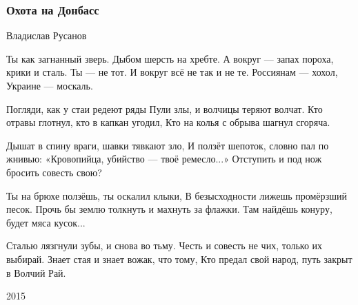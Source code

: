  
 
 

\subsubsection{Охота на Донбасс}
\label{sec:poetry.rus.dnr.vladislav_rusanov.ohota_na_donbass}

Владислав Русанов

Ты как загнанный зверь. Дыбом шерсть на хребте.
А вокруг --- запах пороха, крики и сталь.
Ты --- не тот. И вокруг всё не так и не те.
Россиянам --- хохол, Украине --- москаль.

Погляди, как у стаи редеют ряды
Пули злы, и волчицы теряют волчат.
Кто отравы глотнул, кто в капкан угодил,
Кто на колья с обрыва шагнул сгоряча.

Дышат в спину враги, шавки тявкают зло,
И ползёт шепоток, словно пал по жнивью:
«Кровопийца, убийство --- твоё ремесло...»
Отступить и под нож бросить совесть свою?

Ты на брюхе ползёшь, ты оскалил клыки,
В безысходности лижешь промёрзший песок.
Прочь бы землю толкнуть и махнуть за флажки.
Там найдёшь конуру, будет мяса кусок...

Сталью лязгнули зубы, и снова во тьму.
Честь и совесть не чих, только их выбирай.
Знает стая и знает вожак, что тому,
Кто предал свой народ, путь закрыт в Волчий Рай.

2015
